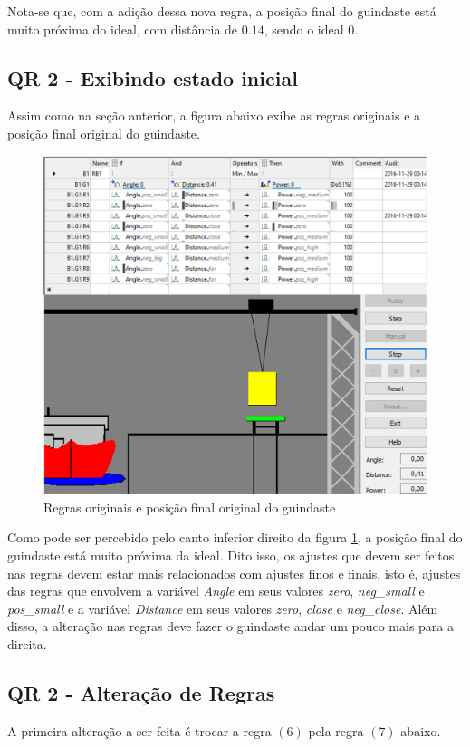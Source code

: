 \documentclass[12pt]{article}
\begin{document}
Nota-se que, com a adição dessa nova regra, a posição final do guindaste está muito próxima do ideal, com distância de $0.14$, sendo o ideal $0$.


\subsection{QR 2 - Exibindo estado inicial}

Assim como na seção anterior, a figura abaixo exibe as regras originais e a posição final original do guindaste.
\begin{figure}[H]
	\centering
	\includegraphics[width=0.7\linewidth]{Imagens/QR2/estadoOriginal}
	\caption{Regras originais e posição final original do guindaste}
	\label{fig:estadooriginal}
\end{figure}

Como pode ser percebido pelo canto inferior direito da figura \ref{fig:estadooriginal}, a posição final do guindaste está muito próxima da ideal. Dito isso, os ajustes que devem ser feitos nas regras devem estar mais relacionados com ajustes finos e finais, isto é, ajustes das regras que envolvem a variável \textit{Angle} em seus valores \textit{zero}, \textit{neg\_small} e \textit{pos\_small} e a variável \textit{Distance} em seus valores \textit{zero}, \textit{close} e \textit{neg\_close}. Além disso, a alteração nas regras deve fazer o guindaste andar um pouco mais para a direita.

\subsection{QR 2 - Alteração de Regras}

A primeira alteração a ser feita é trocar a regra $(6)$ pela regra $(7)$ abaixo.
\end{document}
